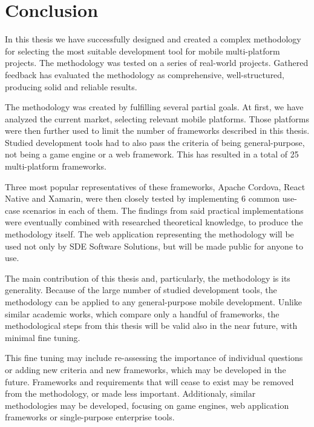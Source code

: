 \documentclass[english,master,public,dept460,male,cpdeclaration,oneside]{diploma}
\begin{document}
\section{Conclusion}

In this thesis we have successfully designed and created a complex methodology for selecting the most suitable development tool for mobile multi-platform projects. The methodology was tested on a series of real-world projects. Gathered feedback has evaluated the methodology as comprehensive, well-structured, producing solid and reliable results. 

The methodology was created by fulfilling several partial goals. At first, we have analyzed the current market, selecting relevant mobile platforms. Those platforms were then further used to limit the number of frameworks described in this thesis. Studied development tools had to also pass the criteria of being general-purpose, not being a game engine or a web framework. This has resulted in a total of 25 multi-platform frameworks.

Three most popular representatives of these frameworks, Apache Cordova, React Native and Xamarin, were then closely tested by implementing 6 common use-case scenarios in each of them. The findings from said practical implementations were eventually combined with researched theoretical knowledge, to produce the methodology itself. The web application representing the methodology will be used not only by SDE Software Solutions, but will be made public for anyone to use.

The main contribution of this thesis and, particularly, the methodology is its generality. Because of the large number of studied development tools, the methodology can be applied to any general-purpose mobile development. Unlike similar academic works, which compare only a handful of frameworks, the methodological steps from this thesis will be valid also in the near future, with minimal fine tuning.

This fine tuning may include re-assessing the importance of individual questions or adding new criteria and new frameworks, which may be developed in the future. Frameworks and requirements that will cease to exist may be removed from the methodology, or made less important. Additionaly, similar methodologies may be developed, focusing on game engines, web application frameworks or single-purpose enterprise tools.
\end{document}
